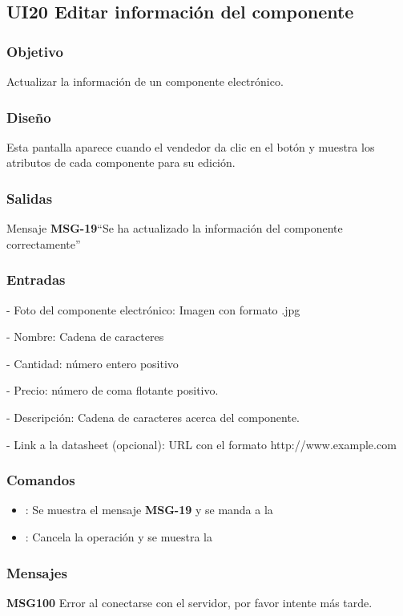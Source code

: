 \subsection{UI20 Editar información del componente}

\subsubsection{Objetivo}
	Actualizar la información de un componente electrónico.

\subsubsection{Diseño}
	Esta pantalla aparece cuando el vendedor da clic en el botón  y muestra los atributos de cada componente para su edición.


\subsubsection{Salidas}

	Mensaje {\bf MSG-19}``Se ha actualizado la información del componente correctamente''

\subsubsection{Entradas}
	- Foto del componente electrónico: Imagen con formato .jpg
		
	- Nombre: Cadena de caracteres
		
	- Cantidad: número entero positivo
		
	- Precio: número de coma flotante positivo.
		
	- Descripción: Cadena de caracteres acerca del componente.
		
	- Link a la datasheet (opcional): URL con el formato http://www.example.com
\subsubsection{Comandos}
\begin{itemize}
	\item {}: Se muestra el mensaje {\bf MSG-19} y se manda a la 
	\item {}: Cancela la operación y se muestra la 
\end{itemize}
\subsubsection{Mensajes}
	\begin{Citemize}
		\item {\bf MSG100} Error al conectarse con el servidor, por favor intente más tarde.
	\end{Citemize}